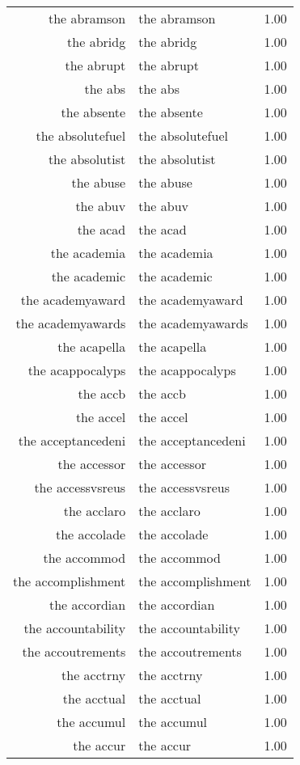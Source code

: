 \begin{table}[ht]
\begin{tabular}{rlr}
  the abramson & the abramson & 1.00 \\ 
  the abridg & the abridg & 1.00 \\ 
  the abrupt & the abrupt & 1.00 \\ 
  the abs & the abs & 1.00 \\ 
  the absente & the absente & 1.00 \\ 
  the absolutefuel & the absolutefuel & 1.00 \\ 
  the absolutist & the absolutist & 1.00 \\ 
  the abuse & the abuse & 1.00 \\ 
  the abuv & the abuv & 1.00 \\ 
  the acad & the acad & 1.00 \\ 
  the academia & the academia & 1.00 \\ 
  the academic & the academic & 1.00 \\ 
  the academyaward & the academyaward & 1.00 \\ 
  the academyawards & the academyawards & 1.00 \\ 
  the acapella & the acapella & 1.00 \\ 
  the acappocalyps & the acappocalyps & 1.00 \\ 
  the accb & the accb & 1.00 \\ 
  the accel & the accel & 1.00 \\ 
  the acceptancedeni & the acceptancedeni & 1.00 \\ 
  the accessor & the accessor & 1.00 \\ 
  the accessvsreus & the accessvsreus & 1.00 \\ 
  the acclaro & the acclaro & 1.00 \\ 
  the accolade & the accolade & 1.00 \\ 
  the accommod & the accommod & 1.00 \\ 
  the accomplishment & the accomplishment & 1.00 \\ 
  the accordian & the accordian & 1.00 \\ 
  the accountability & the accountability & 1.00 \\ 
  the accoutrements & the accoutrements & 1.00 \\ 
  the acctrny & the acctrny & 1.00 \\ 
  the acctual & the acctual & 1.00 \\ 
  the accumul & the accumul & 1.00 \\ 
  the accur & the accur & 1.00 \\ 

\end{tabular}
\end{table}
